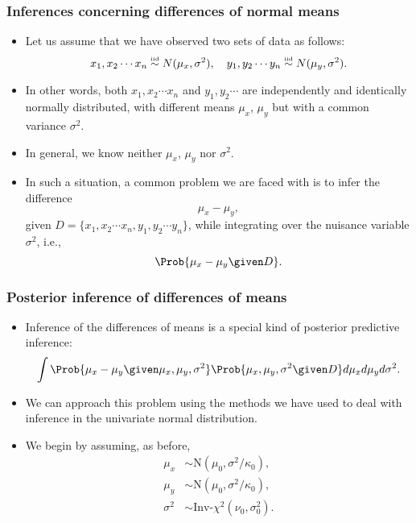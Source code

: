 \documentclass{slides}
\begin{document}
\begin{frame}
	\frametitle{Inferences concerning differences of normal means}
	\begin{itemize}
		\item Let us assume that we have observed two sets of data as follows:
			\[x_1, x_2 \cdots x_n \iidsim N(\mu_{x}, \sigma^2), \quad y_1, y_2 \cdots y_n \iidsim N(\mu_{y}, \sigma^2).\]

		\item In other words, both $x_1, x_2 \cdots x_n$ and $y_1, y_2 \cdots$ are independently and identically normally distributed, with different means $\mu_x$, $\mu_y$ but with a common variance $\sigma^2$.
		\item In general, we know neither $\mu_x$, $\mu_y$ nor $\sigma^2$.
		\item In such a situation, a common problem we are faced with is to infer the difference
			\[ \mu_x - \mu_y,\]
			given $D=\{x_1, x_2 \cdots x_n, y_1, y_2 \cdots y_n\}$, while integrating over the nuisance variable $\sigma^2$, i.e.,
			\[
				\Prob{\mu_x - \mu_y \given D}.
			\]
	\end{itemize}
\end{frame}

\begin{frame}
	\frametitle{Posterior inference of differences of means}
	\begin{itemize}
		\item Inference of the differences of means is a special kind of posterior predictive inference:
			\[
				\int \Prob{\mu_x - \mu_y \given \mu_x, \mu_y, \sigma^2}\Prob{\mu_x, \mu_y, \sigma^2\given D} d\mu_xd\mu_yd\sigma^2.
			\]
		\item We can approach this problem using the methods we have used to deal with inference in the univariate normal distribution.
		\item We begin by assuming, as before,
			\begin{align*}
				\mu_x &\sim \textrm{N}(\mu_0, \sigma^2/\kappa_0),\\
				\mu_y &\sim \textrm{N}(\mu_0, \sigma^2/\kappa_0),\\
				\sigma^2 &\sim \textrm{Inv-}\chi^2(\nu_0, \sigma^2_0).
			\end{align*}

	\end{itemize}
\end{frame}
\end{document}
